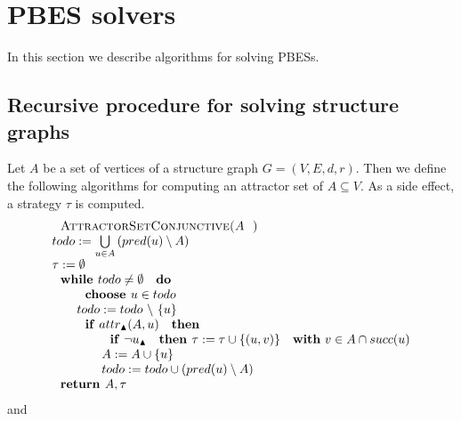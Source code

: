                       

\section{PBES solvers}

In this section we describe algorithms for solving PBESs.

\subsection{Recursive procedure for solving structure graphs}

Let $A$ be a set of vertices of a structure graph $G=(V,E,d,r)$. Then we
define the following algorithms for computing an attractor set of $%
A\subseteq V$. As a side effect, a strategy $\tau $ is computed.%
\begin{equation*}
\begin{array}{l}
\text{\textsc{AttractorSetConjunctive(}}A\text{\textsc{)}} \\ 
todo:=\bigcup\limits_{u\in A}\left( pred(u)\setminus A\right)  \\ 
\tau :=\emptyset  \\ 
\text{\textbf{while }}todo\neq \emptyset \text{ \textbf{do}} \\ 
\qquad \text{\textbf{choose }}u\in todo \\ 
\qquad todo:=todo\ \backslash \ \{u\} \\ 
\qquad \text{\textbf{if} }attr_{\blacktriangle }(A,u)\text{ \textbf{then}}
\\ 
\qquad \qquad \text{\textbf{if} }\lnot u_{\blacktriangle }\text{ \textbf{%
then }}\tau :=\tau \cup \{(u,v)\}\text{ \textbf{with} }v\in A\cap succ(u) \\ 
\qquad \qquad A:=A\cup \{u\} \\ 
\qquad \qquad todo:=todo\cup \left( pred(u)\setminus A\right)  \\ 
\text{\textbf{return }}A,\tau 
\end{array}%
\end{equation*}%
and%
